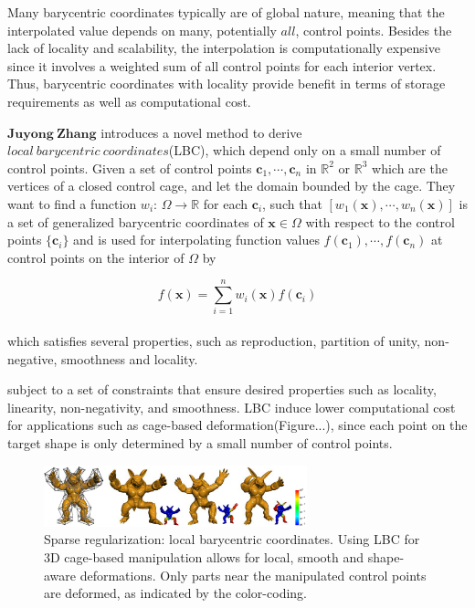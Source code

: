 Many barycentric coordinates typically are of global nature, meaning that the interpolated value depends on many, potentially $all$, control points. Besides the lack of locality and scalability, the interpolation is computationally expensive since it involves a weighted sum of all control points for each interior vertex.
Thus, barycentric coordinates with locality provide benefit in terms of storage requirements as well as computational cost.

$\mathbf{Juyong~Zhang}$ introduces a novel method to derive $local~barycentric~coordinates$(LBC), which depend only on a small number of control points.
Given a set of control points $\mathbf{c}_1, \cdots, \mathbf{c}_n$ in $\mathbb{R}^2$ or  $\mathbb{R}^3$ which are the vertices of a closed control cage, and let the domain bounded by the cage.
They want to find a function $w_{i}$: $\Omega\rightarrow\mathbb{R}$ for each $\mathbf{c}_{i}$, such that $[w_1(\mathbf{x}), \cdots, w_n(\mathbf{x})]$ is a set of generalized barycentric coordinates of $\mathbf{x}\in\Omega$ with respect to the control points $\{\mathbf{c}_{i}\}$ and is used for interpolating function values $f(\mathbf{c}_1), \cdots, f(\mathbf{c}_n)$ at control points on the interior of $\Omega$ by

\small{
\begin{equation}
 \label{eq:BC}
 f(\mathbf{x}) = \sum_{i=1}^{n}w_{i}(\mathbf{x})f(\mathbf{c}_{i})
\end{equation}
}
\\
which satisfies several properties, such as reproduction, partition of unity, non-negative, smoothness and locality.



subject to a set of constraints that ensure desired properties such as locality, linearity, non-negativity, and smoothness.
LBC induce lower computational cost for applications such as cage-based deformation(Figure...), since each point on the target shape is only determined by a small number of control points.

\begin{figure}[ht]
  \centering
  \includegraphics[width=3in]{images/LBC_L1}
  \caption{Sparse regularization: local barycentric coordinates\cite{}. Using LBC for 3D cage-based manipulation allows for local, smooth and shape-aware deformations. Only parts near the manipulated control points are deformed, as indicated by the color-coding.}
\end{figure}



